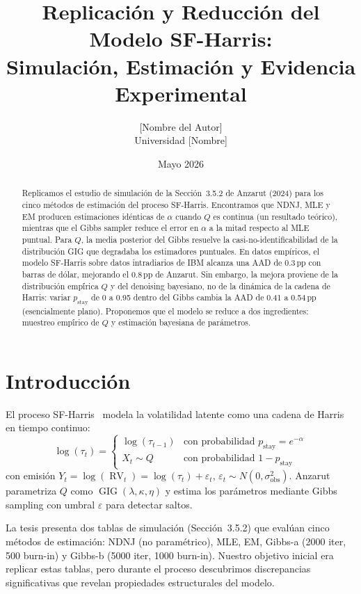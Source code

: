 \documentclass[12pt,letterpaper]{article}
\title{\vspace{-1.5cm}\textbf{Replicaci\'{o}n y Reducci\'{o}n del Modelo SF-Harris:\\
Simulaci\'{o}n, Estimaci\'{o}n y Evidencia Experimental}}
\author{[Nombre del Autor]\\ \smallskip \small Universidad [Nombre]}
\date{Mayo 2026}
\newcommand{\pstay}{p_{\text{stay}}}
\newcommand{\RV}{\operatorname{RV}}
\newcommand{\GIG}{\operatorname{GIG}}
\begin{document}
\maketitle

\begin{abstract}
Replicamos el estudio de simulaci\'{o}n de la Secci\'{o}n~3.5.2 de Anzarut (2024) para los cinco m\'{e}todos de estimaci\'{o}n del proceso SF-Harris.
Encontramos que NDNJ, MLE y EM producen estimaciones id\'{e}nticas de $\alpha$ cuando $Q$ es continua (un resultado te\'{o}rico), mientras que el Gibbs sampler reduce el error en $\alpha$ a la mitad respecto al MLE puntual.
Para $Q$, la media posterior del Gibbs resuelve la casi-no-identificabilidad de la distribuci\'{o}n GIG que degradaba los estimadores puntuales.
En datos emp\'{i}ricos, el modelo SF-Harris sobre datos intradiarios de IBM alcanza una AAD de 0.3\,pp con barras de d\'{o}lar, mejorando el 0.8\,pp de Anzarut.
Sin embargo, la mejora proviene de la distribuci\'{o}n emp\'{\'i}rica $Q$ y del denoising bayesiano, no de la din\'{a}mica de la cadena de Harris: variar $\pstay$ de 0 a 0.95 dentro del Gibbs cambia la AAD de 0.41 a 0.54\,pp (esencialmente plano).
Proponemos que el modelo se reduce a dos ingredientes: muestreo emp\'{\'i}rico de $Q$ y estimaci\'{o}n bayesiana de par\'{a}metros.
\end{abstract}

\section{Introducci\'{o}n}

El proceso SF-Harris~\citep{anzarut2024} modela la volatilidad latente como una cadena de Harris en tiempo continuo:
\begin{equation}
    \log(\tau_t) = \begin{cases}
        \log(\tau_{t-1}) & \text{con probabilidad } \pstay = e^{-\alpha} \\
        X_t \sim Q & \text{con probabilidad } 1 - \pstay
    \end{cases}
    \label{eq:harris}
\end{equation}
con emisi\'{o}n $Y_t = \log(\RV_t) = \log(\tau_t) + \varepsilon_t$, $\varepsilon_t \sim N(0, \sigma_{\text{obs}}^2)$.
Anzarut parametriza $Q$ como $\GIG(\lambda, \kappa, \eta)$ y estima los par\'{a}metros mediante Gibbs sampling con umbral $\varepsilon$ para detectar saltos.

La tesis presenta dos tablas de simulaci\'{o}n (Secci\'{o}n~3.5.2) que eval\'{u}an cinco m\'{e}todos de estimaci\'{o}n: NDNJ (no param\'{e}trico), MLE, EM, Gibbs-a (2000 iter, 500 burn-in) y Gibbs-b (5000 iter, 1000 burn-in).
Nuestro objetivo inicial era replicar estas tablas, pero durante el proceso descubrimos discrepancias significativas que revelan propiedades estructurales del modelo.
\end{document}

